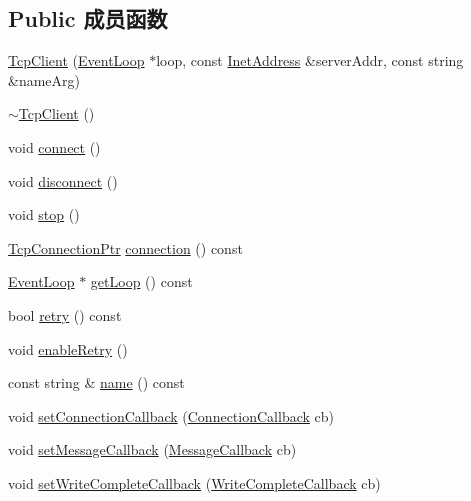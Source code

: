 \subsection*{Public 成员函数}
\begin{DoxyCompactItemize}
\item 
\hyperlink{classmuduo_1_1net_1_1TcpClient_aa9f48eab5a57218e8d81d574c961903e}{Tcp\+Client} (\hyperlink{classmuduo_1_1net_1_1EventLoop}{Event\+Loop} $\ast$loop, const \hyperlink{classmuduo_1_1net_1_1InetAddress}{Inet\+Address} \&server\+Addr, const string \&name\+Arg)
\item 
\hyperlink{classmuduo_1_1net_1_1TcpClient_a01845d2886f327b9c8cb5df03cb00d7c}{$\sim$\+Tcp\+Client} ()
\item 
void \hyperlink{classmuduo_1_1net_1_1TcpClient_a1396bf9b5defe9fa844a63b5cd40ac0e}{connect} ()
\item 
void \hyperlink{classmuduo_1_1net_1_1TcpClient_a960705de531a20389fb29928d43258c3}{disconnect} ()
\item 
void \hyperlink{classmuduo_1_1net_1_1TcpClient_a8c528baf37154d347366083f0f816846}{stop} ()
\item 
\hyperlink{namespacemuduo_1_1net_ab91a46e9290926aa692450e46cfc9039}{Tcp\+Connection\+Ptr} \hyperlink{classmuduo_1_1net_1_1TcpClient_aad3fe0470c6ae2b643bb3b834742e8f4}{connection} () const
\item 
\hyperlink{classmuduo_1_1net_1_1EventLoop}{Event\+Loop} $\ast$ \hyperlink{classmuduo_1_1net_1_1TcpClient_aef1cbfe0592e8196e6c81b4db82a39ce}{get\+Loop} () const
\item 
bool \hyperlink{classmuduo_1_1net_1_1TcpClient_aed2da3d81e2ab3b35cce19615d9434a7}{retry} () const
\item 
void \hyperlink{classmuduo_1_1net_1_1TcpClient_a24bbe5c717dfa26078c7deb6cbf9a71c}{enable\+Retry} ()
\item 
const string \& \hyperlink{classmuduo_1_1net_1_1TcpClient_a47f4f0a66d5a539e687100dc65462ced}{name} () const
\item 
void \hyperlink{classmuduo_1_1net_1_1TcpClient_a613fdc6fe71445fb2b6a498c95182769}{set\+Connection\+Callback} (\hyperlink{namespacemuduo_1_1net_a78754792e997a13cb10908eb7ec508b2}{Connection\+Callback} cb)
\item 
void \hyperlink{classmuduo_1_1net_1_1TcpClient_a255ca8682452453c06c57f7089cd0d0c}{set\+Message\+Callback} (\hyperlink{namespacemuduo_1_1net_acaa802028467a41738aeb49699e85285}{Message\+Callback} cb)
\item 
void \hyperlink{classmuduo_1_1net_1_1TcpClient_a6227807d046b4efd134dff53989916d6}{set\+Write\+Complete\+Callback} (\hyperlink{namespacemuduo_1_1net_a525c3730bfefb763975b035ebc88a63d}{Write\+Complete\+Callback} cb)
\end{DoxyCompactItemize}
